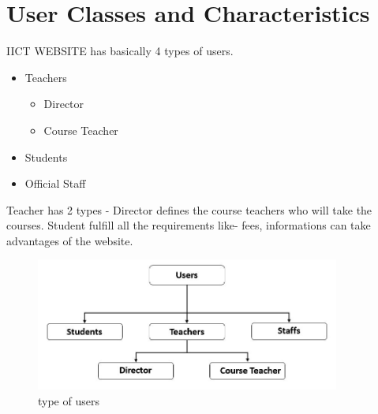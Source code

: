 \documentclass{scrreprt}
\begin{document}
\section{User Classes and Characteristics}
IICT WEBSITE has basically 4 types of users. 
\begin{itemize}
  \item Teachers
    \begin{itemize}
        \item Director
        \item Course Teacher
    \end{itemize}
  \item Students
  \item Official Staff
\end{itemize}
Teacher has 2 types - Director defines the course teachers who will take the courses. Student fulfill all the requirements like- fees, informations can take advantages of the website. 
\begin{figure}
    \centering
    \includegraphics[width=10cm]{assets/2.JPG}
    \caption{type of users}
    \label{fig:type of users}
\end{figure}
\end{document}
